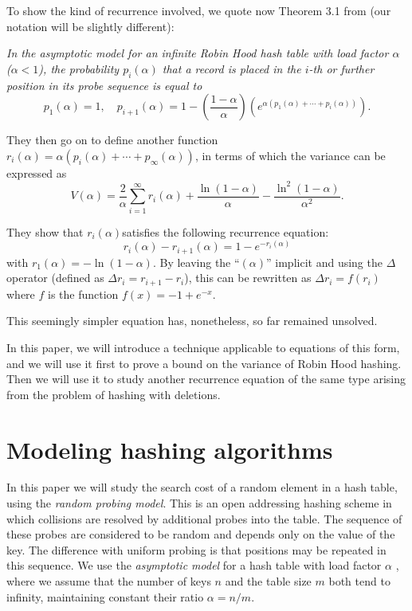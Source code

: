\documentclass[proceedings]{aofa}
\begin{document}
To show the kind of recurrence involved, we quote now Theorem 3.1 from \cite{CelisT} (our notation will be slightly different):

 {\em In the asymptotic model for an infinite Robin Hood hash table with load factor $\alpha$ ($\alpha<1$), the probability $p_i(\alpha)$ that a record is placed in the $i$-th or further position in its probe sequence is equal to}
\begin{equation}
p_1(\alpha) = 1, \quad 
p_{i+1}(\alpha) = 1-\left( \frac{1-\alpha}{\alpha} \right) \left( e^{\alpha(p_1(\alpha)+\cdots+p_i(\alpha))}  \right).
\end{equation}


They then go on to define another function $r_i(\alpha)=\alpha(p_i(\alpha)+\cdots+p_{\infty}(\alpha))$, in terms of which the variance can be expressed as
\begin{equation}
V(\alpha) = \frac{2}{\alpha}\sum_{i=1}^{\infty} r_i(\alpha) + \frac{\ln(1-\alpha)}{\alpha}-\frac{\ln^2(1-\alpha)}{\alpha^2}.
\end{equation}

They show that $r_i(\alpha)$satisfies the following recurrence equation:
\begin{equation}
\label{eq:Celisr}
r_i(\alpha)-r_{i+1}(\alpha) = 1-e^{-r_i(\alpha)}
\end{equation}
with $r_1(\alpha)=-\ln(1-\alpha)$.
By leaving the ``$(\alpha)$'' implicit and using the $\Delta$ operator (defined as $\Delta r_i=r_{i+1}-r_i$), this can be rewritten as
$\Delta  r_i = f(r_i)$
where $f$ is the function $f(x)=-1+e^{-x}$.

This seemingly simpler equation has, nonetheless, so far remained unsolved.

In this paper, we will introduce a technique applicable to equations of this form, and we will use it first to prove a bound on the variance of Robin Hood hashing. Then we will use it to study another recurrence equation of the same type arising from the problem of hashing with deletions.

\section{Modeling hashing algorithms}


In this paper we will study the search cost of a
random element in a hash table, using the \emph{random probing model}.
This is an open addressing
hashing scheme in which collisions are resolved by additional probes
into the table.  The sequence of these probes are considered to be
random and depends only on the value of the key. The difference with
uniform probing is that positions may be repeated in this sequence.
We use the {\em asymptotic model} for a hash table with load factor $\alpha$ \cite{guibas1976analysis,Guibas:1978:AHT:322092.322096,Celis,Mit}, where we assume that
the number of keys $n$ and the table size $m$
both tend to infinity, maintaining constant their ratio $\alpha = n/m$.
\end{document}
